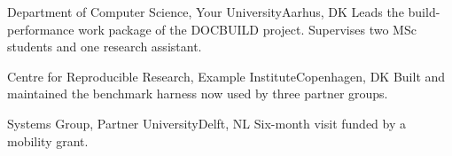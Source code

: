 
  {Department of Computer Science, Your University}{Aarhus, DK}
  {Leads the build-performance work package of the DOCBUILD project.
   Supervises two MSc students and one research assistant.}

  {Centre for Reproducible Research, Example Institute}{Copenhagen, DK}
  {Built and maintained the benchmark harness now used by three
   partner groups.}

  {Systems Group, Partner University}{Delft, NL}
  {Six-month visit funded by a mobility grant.}
